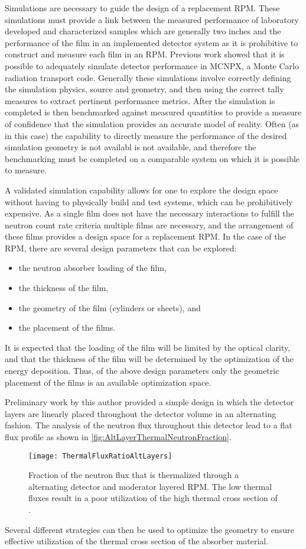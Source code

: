 Simulations are necessary to guide the design of a replacement RPM.
These simulations must provide a link between the measured performance of laboratory developed and characterized samples which are generally two inches and the performance of the film in an implemented detector system as it is prohibitive to construct and measure each film in an RPM.
Previous work showed that it is possible to adequately simulate detector performance in MCNPX, a Monte Carlo radiation transport code.
Generally these simulations involve correctly defining the simulation physics, source and geometry, and then using the correct tally measures to extract pertinent performance metrics.
After the simulation is completed is then benchmarked against measured quantities to provide a measure of confidence that the simulation provides an accurate model of reality.
Often (as in this case) the capability to directly measure the performance of the desired simulation geometry is not availabl is not available, and therefore the benchmarking must be completed on a comparable system on which it is possible to measure.

A validated simulation capability allows for one to explore the design space without having to physically build and test systems, which can be prohibitively expensive.
As a single film does not have the necessary interactions to fulfill the neutron count rate criteria multiple films are necessary, and the arrangement of these films provides a design space for a replacement RPM.
In the case of the RPM, there are several design parameters that can be explored:
\begin{itemize}
  \item the neutron absorber loading of the film,
  \item the thickness of the film,
  \item the geometry of the film (cylinders or sheets), and
  \item the placement of the films.
\end{itemize}
It is expected that the loading of the film will be limited by the optical clarity, and that the thickness of the film will be determined by the optimization of the energy deposition.
Thus, of the above design parameters only the geometric placement of the films is an available optimization space.

Preliminary work by this author provided a simple design in which the detector layers are linearly placed throughout the detector volume in an alternating fashion.
The analysis of the neutron flux throughout this detector lead to a flat flux profile as shown in \autoref{fig:AltLayerThermalNeutronFraction}.
\begin{figure}
  \texttt{[image: ThermalFluxRatioAltLayers]}
	\caption{Fraction of the neutron flux that is thermalized through a alternating detector and moderator layered RPM.  The low thermal fluxes result in a poor utilization of the high thermal cross section of .}
	\label{fig:AltLayerThermalNeutronFraction}
\end{figure}
Several different strategies can then be used to optimize the geometry to ensure effective utilization of the thermal cross section of the absorber material.


